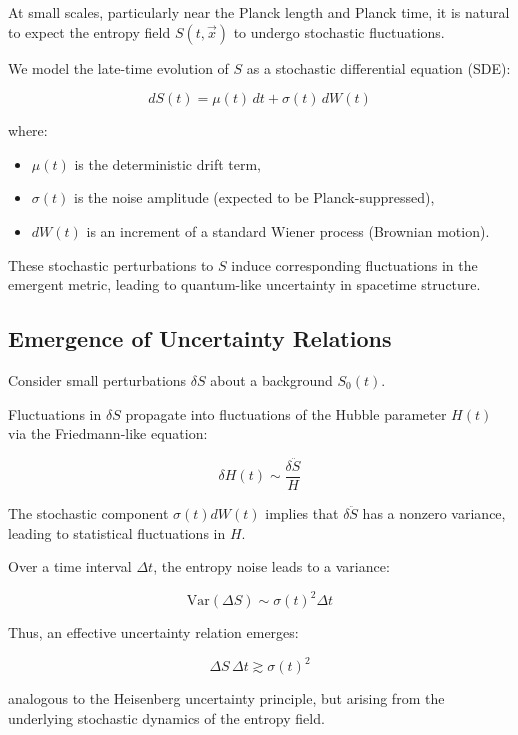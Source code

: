 \documentclass{article}
\begin{document}
At small scales, particularly near the Planck length and Planck time, it is natural to expect the entropy field $S(t, \vec{x})$ to undergo stochastic fluctuations.

We model the late-time evolution of $S$ as a stochastic differential equation (SDE):

\begin{equation}
dS(t) = \mu(t) \, dt + \sigma(t) \, dW(t)
\end{equation}

where:
\begin{itemize}
    \item $\mu(t)$ is the deterministic drift term,
    \item $\sigma(t)$ is the noise amplitude (expected to be Planck-suppressed),
    \item $dW(t)$ is an increment of a standard Wiener process (Brownian motion).
\end{itemize}

These stochastic perturbations to $S$ induce corresponding fluctuations in the emergent metric, leading to quantum-like uncertainty in spacetime structure.

\subsection{Emergence of Uncertainty Relations}

Consider small perturbations $\delta S$ about a background $S_0(t)$.

Fluctuations in $\delta S$ propagate into fluctuations of the Hubble parameter $H(t)$ via the Friedmann-like equation:

\[
\delta H(t) \sim \frac{\delta \ddot{S}}{H}
\]

The stochastic component $\sigma(t) dW(t)$ implies that $\delta \ddot{S}$ has a nonzero variance, leading to statistical fluctuations in $H$.

Over a time interval $\Delta t$, the entropy noise leads to a variance:

\[
\text{Var}(\Delta S) \sim \sigma(t)^2 \Delta t
\]

Thus, an effective uncertainty relation emerges:

\begin{equation}
\Delta S \, \Delta t \gtrsim \sigma(t)^2
\label{eq:EntropyUncertainty}
\end{equation}

analogous to the Heisenberg uncertainty principle, but arising from the underlying stochastic dynamics of the entropy field.
\end{document}
